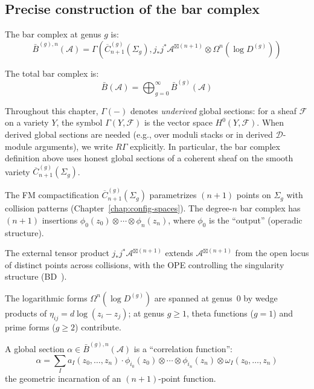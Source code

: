 \subsection{Precise construction of the bar complex}

\begin{definition}
The bar complex at genus $g$ is:
\[\bar{B}^{(g),n}(\mathcal{A}) = \Gamma\left(\overline{C}_{n+1}^{(g)}(\Sigma_g), j_*j^*\mathcal{A}^{\boxtimes(n+1)} \otimes \Omega^n(\log D^{(g)})\right)\]

The total bar complex is:
\[\bar{B}(\mathcal{A}) = \bigoplus_{g=0}^{\infty} \bar{B}^{(g)}(\mathcal{A})\]
\end{definition}

\begin{convention}\label{conv:gamma-vs-rgamma}
Throughout this chapter, $\Gamma(-)$ denotes \emph{underived} global sections:
for a sheaf $\mathcal{F}$ on a variety $Y$, the symbol $\Gamma(Y, \mathcal{F})$
is the vector space $H^0(Y, \mathcal{F})$.  When derived global sections are
needed (e.g., over moduli stacks or in derived $\mathcal{D}$-module arguments),
we write $R\Gamma$ explicitly.  In particular, the bar complex definition above
uses honest global sections of a coherent sheaf on the smooth variety
$\overline{C}_{n+1}^{(g)}(\Sigma_g)$.
\end{convention}

\begin{remark}\label{rem:unpacking-bar-def}
The FM compactification $\overline{C}_{n+1}^{(g)}(\Sigma_g)$ parametrizes $(n+1)$ points on $\Sigma_g$ with collision patterns (Chapter~\ref{chap:config-spaces}).  The degree-$n$ bar complex has $(n+1)$ insertions $\phi_0(z_0) \otimes \cdots \otimes \phi_n(z_n)$, where $\phi_0$ is the ``output'' (operadic structure).

The external tensor product $j_*j^*\mathcal{A}^{\boxtimes(n+1)}$ extends $\mathcal{A}^{\boxtimes(n+1)}$ from the open locus of distinct points across collisions, with the OPE controlling the singularity structure (BD~\cite[\S3.4.14--3.4.22]{BD04}).

The logarithmic forms $\Omega^n(\log D^{(g)})$ are spanned at genus~$0$ by wedge products of $\eta_{ij} = d\log(z_i - z_j)$; at genus $g \geq 1$, theta functions ($g=1$) and prime forms ($g \geq 2$) contribute.

A global section $\alpha \in \bar{B}^{(g),n}(\mathcal{A})$ is a ``correlation function'':
\[\alpha = \sum_I a_I(z_0, \ldots, z_n) \cdot \phi_{i_0}(z_0) \otimes \cdots \otimes \phi_{i_n}(z_n) \otimes \omega_I(z_0, \ldots, z_n)\]
the geometric incarnation of an $(n+1)$-point function.
\end{remark}

